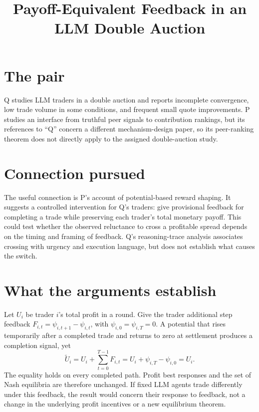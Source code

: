 \documentclass{article}
\title{Payoff-Equivalent Feedback in an LLM Double Auction}
\begin{document}
\maketitle

\section{The pair}

Q studies LLM traders in a double auction and reports incomplete convergence, low trade volume in some conditions, and frequent small quote improvements. P studies an interface from truthful peer signals to contribution rankings, but its references to ``Q'' concern a different mechanism-design paper, so its peer-ranking theorem does not directly apply to the assigned double-auction study. 

\section{Connection pursued}

The useful connection is P's account of potential-based reward shaping. It suggests a controlled intervention for Q's traders: give provisional feedback for completing a trade while preserving each trader's total monetary payoff. This could test whether the observed reluctance to cross a profitable spread depends on the timing and framing of feedback. Q's reasoning-trace analysis associates crossing with urgency and execution language, but does not establish what causes the switch. 

\section{What the arguments establish}

Let \(U_i\) be trader \(i\)'s total profit in a round. Give the trader additional step feedback \(F_{i,t}=\psi_{i,t+1}-\psi_{i,t}\), with \(\psi_{i,0}=\psi_{i,T}=0\). A potential that rises temporarily after a completed trade and returns to zero at settlement produces a completion signal, yet
\[
\widetilde U_i
=U_i+\sum_{t=0}^{T-1}F_{i,t}
=U_i+\psi_{i,T}-\psi_{i,0}
=U_i.
\]
The equality holds on every completed path. Profit best responses and the set of Nash equilibria are therefore unchanged. If fixed LLM agents trade differently under this feedback, the result would concern their response to feedback, not a change in the underlying profit incentives or a new equilibrium theorem. 
\end{document}
